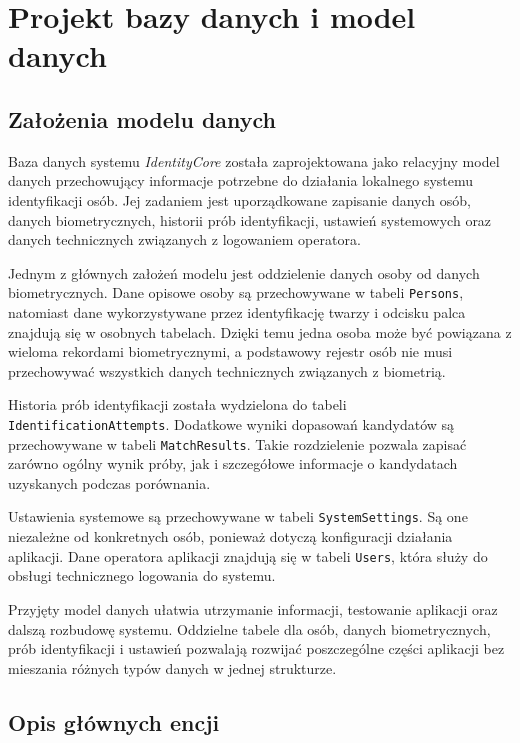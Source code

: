 \chapter{Projekt bazy danych i model danych}
\label{chap:baza-danych}

\section{Założenia modelu danych}

Baza danych systemu \textit{IdentityCore} została zaprojektowana jako relacyjny model danych przechowujący informacje potrzebne do działania lokalnego systemu identyfikacji osób. Jej zadaniem jest uporządkowane zapisanie danych osób, danych biometrycznych, historii prób identyfikacji, ustawień systemowych oraz danych technicznych związanych z logowaniem operatora.

Jednym z głównych założeń modelu jest oddzielenie danych osoby od danych biometrycznych. Dane opisowe osoby są przechowywane w tabeli \texttt{Persons}, natomiast dane wykorzystywane przez identyfikację twarzy i odcisku palca znajdują się w osobnych tabelach. Dzięki temu jedna osoba może być powiązana z wieloma rekordami biometrycznymi, a podstawowy rejestr osób nie musi przechowywać wszystkich danych technicznych związanych z biometrią.

Historia prób identyfikacji została wydzielona do tabeli \texttt{IdentificationAttempts}. Dodatkowe wyniki dopasowań kandydatów są przechowywane w tabeli \texttt{MatchResults}. Takie rozdzielenie pozwala zapisać zarówno ogólny wynik próby, jak i szczegółowe informacje o kandydatach uzyskanych podczas porównania.

Ustawienia systemowe są przechowywane w tabeli \texttt{SystemSettings}. Są one niezależne od konkretnych osób, ponieważ dotyczą konfiguracji działania aplikacji. Dane operatora aplikacji znajdują się w tabeli \texttt{Users}, która służy do obsługi technicznego logowania do systemu.

Przyjęty model danych ułatwia utrzymanie informacji, testowanie aplikacji oraz dalszą rozbudowę systemu. Oddzielne tabele dla osób, danych biometrycznych, prób identyfikacji i ustawień pozwalają rozwijać poszczególne części aplikacji bez mieszania różnych typów danych w jednej strukturze.

\section{Opis głównych encji}

